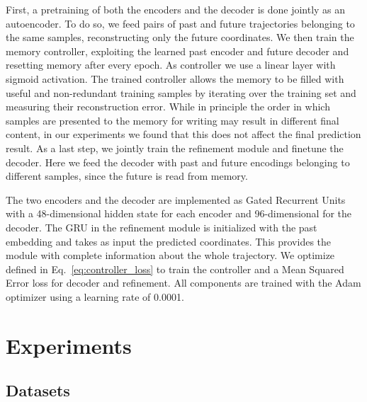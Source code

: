 \documentclass[10pt,twocolumn,letterpaper]{article}
\begin{document}
First, a pretraining of both the encoders and the decoder is done jointly as an autoencoder. To do so, we feed pairs of past and future trajectories belonging to the same samples, reconstructing only the future coordinates.
We then train the memory controller, exploiting the learned past encoder and future decoder and resetting memory after every epoch. As controller we use a linear layer with sigmoid activation. The trained controller allows the memory to be filled with useful and non-redundant training samples by iterating over the training set and measuring their reconstruction error. While in principle the order in which samples are presented to the memory for writing may result in different final content, in our experiments we found that this does not affect the final prediction result. As a last step, we jointly train the refinement module and finetune the decoder. Here we feed the decoder with past and future encodings belonging to different samples, since the future is read from memory.



The two encoders and the decoder are implemented as Gated Recurrent Units with a 48-dimensional hidden state for each encoder and 96-dimensional for the decoder.
The GRU in the refinement module is initialized with the past embedding and takes as input the predicted coordinates. This provides the module with complete information about the whole trajectory.
We optimize  defined in Eq.~\ref{eq:controller_loss} to train the controller and a Mean Squared Error loss for decoder and refinement.
All components are trained with the Adam optimizer using a learning rate of 0.0001.

\vspace{-5px}
\section{Experiments}


\subsection{Datasets}
\label{sec:datasets}
\end{document}

